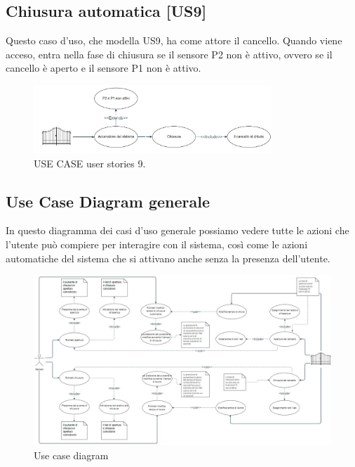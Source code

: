 \documentclass[12pt]{article}
\begin{document}
\subsection{Chiusura automatica [US9]}
Questo caso d'uso, che modella US9, ha come attore il cancello. Quando viene acceso, entra nella fase di chiusura se il sensore P2 non è attivo, ovvero se il cancello è aperto e il sensore P1 non è attivo.
    \begin{figure}[H]
        \centering
        \includegraphics[width=0.8\textwidth]{use_case_us9.jpg}
        \caption{USE CASE user stories 9.}
        \label{fig:use_case_us9}
    \end{figure}
\newpage
\begin{landscape}
\subsection{Use Case Diagram generale}
In questo diagramma dei casi d'uso generale possiamo vedere tutte le azioni che l'utente può compiere per interagire con il sistema, così come le azioni automatiche del sistema che si attivano anche senza la presenza dell'utente.
\begin{figure}[H] %
    \centering %
    \includegraphics[width=1.35\textwidth]{usa_case_diagram.jpg} %
    \caption{Use case diagram} %
    \label{fig:General Use Case Diagram} %
\end{figure}
\end{landscape}
\end{document}
